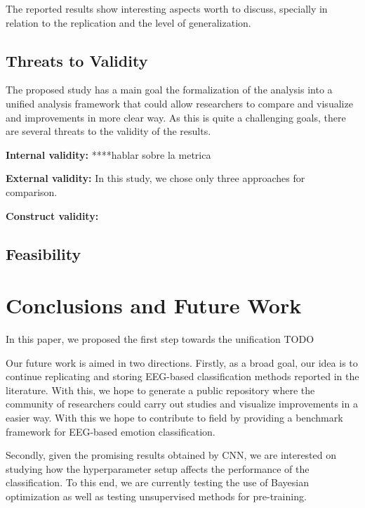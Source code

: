 \documentclass{sig-alternate}
\begin{document}
The reported results show interesting aspects worth to discuss, specially 
in relation to the replication and the level of generalization.


\subsection{Threats to Validity}

The proposed  study has a main goal the formalization
of the analysis into a unified analysis framework 
that could allow researchers to compare and
visualize and improvements in more clear way. 
As this is quite a challenging goals, there are several
threats to the validity of the results. 

\textbf{Internal validity: }  ****hablar sobre la metrica

\textbf{External validity: } In this study, we chose only three approaches
for comparison. 

\textbf{ Construct validity: } 


\subsection{Feasibility}


\section{Conclusions and  Future Work}
\label{conclusion}

In this paper, we proposed the first step towards the unification  TODO


Our future work is aimed in two directions. Firstly, as a broad
goal, our idea is to continue replicating and  storing EEG-based 
classification methods reported in the literature. With this, we hope
to generate a public repository where the community of researchers
could carry out studies and visualize improvements in  a easier way. 
With this we hope to contribute to field by providing a benchmark
framework for EEG-based emotion classification.

Secondly, given the promising results obtained by CNN, we are
interested on studying how the hyperparameter setup affects the 
performance of the classification. To this end, we are currently testing
the use of Bayesian optimization as well as testing unsupervised methods
for pre-training.


%

%
%
\end{document}
